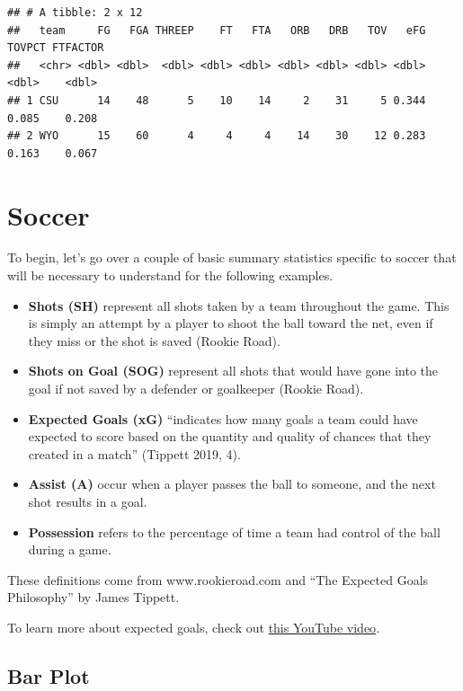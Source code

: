 \documentclass[
  11pt,
]{book}
\theoremstyle{definition}
\theoremstyle{definition}
\theoremstyle{definition}
\theoremstyle{definition}
\theoremstyle{remark}
\begin{document}
\begin{verbatim}
## # A tibble: 2 x 12
##   team     FG   FGA THREEP    FT   FTA   ORB   DRB   TOV   eFG TOVPCT FTFACTOR
##   <chr> <dbl> <dbl>  <dbl> <dbl> <dbl> <dbl> <dbl> <dbl> <dbl>  <dbl>    <dbl>
## 1 CSU      14    48      5    10    14     2    31     5 0.344  0.085    0.208
## 2 WYO      15    60      4     4     4    14    30    12 0.283  0.163    0.067
\end{verbatim}

\hypertarget{soccer}{%
\section{Soccer}\label{soccer}}

To begin, let's go over a couple of basic summary statistics specific to soccer that will be necessary to understand for the following examples.

\begin{itemize}
\item
  \textbf{Shots (SH)} represent all shots taken by a team throughout the game. This is simply an attempt by a player to shoot the ball toward the net, even if they miss or the shot is saved (Rookie Road).
\item
  \textbf{Shots on Goal (SOG)} represent all shots that would have gone into the goal if not saved by a defender or goalkeeper (Rookie Road).
\item
  \textbf{Expected Goals (xG)} ``indicates how many goals a team could have expected to score based on the quantity and quality of chances that they created in a match'' (Tippett 2019, 4).
\item
  \textbf{Assist (A)} occur when a player passes the ball to someone, and the next shot results in a goal.
\item
  \textbf{Possession} refers to the percentage of time a team had control of the ball during a game.
\end{itemize}

These definitions come from www.rookieroad.com and ``The Expected Goals Philosophy'' by James Tippett.

To learn more about expected goals, check out \href{https://www.youtube.com/watch?v=w7zPZsLGK18\&list=PL9Az6mi38hv__afKnHR1AKjpcDIw_0qqT}{this YouTube video}.

\hypertarget{bar-plot}{%
\subsection{Bar Plot}\label{bar-plot}}
\end{document}
